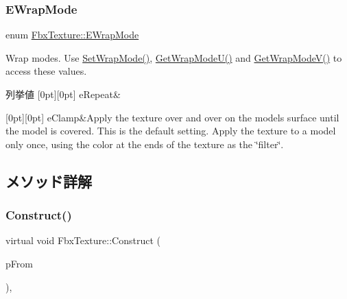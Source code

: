 \subsubsection{\texorpdfstring{E\+Wrap\+Mode}{EWrapMode}}
{\footnotesize\ttfamily enum \hyperlink{class_fbx_texture_ae273dffe3ff532dfd57e7bdb15b121fd}{Fbx\+Texture\+::\+E\+Wrap\+Mode}}

Wrap modes. Use \hyperlink{class_fbx_texture_afb9383ff8cc503b4446247ccdd634ef1}{Set\+Wrap\+Mode()}, \hyperlink{class_fbx_texture_a4df1c01895bf8fb995a5c031de7b77fe}{Get\+Wrap\+Mode\+U()} and \hyperlink{class_fbx_texture_abf31cda728e2ff7f94e10dca19de19d2}{Get\+Wrap\+Mode\+V()} to access these values. \begin{DoxyEnumFields}{列挙値}
[0pt][0pt]{}\mbox{\label{class_fbx_texture_ae273dffe3ff532dfd57e7bdb15b121fda1f253ce288cfae570e2d73d3ee432da8}} 
e\+Repeat&\\
\hline

[0pt][0pt]{}\mbox{\label{class_fbx_texture_ae273dffe3ff532dfd57e7bdb15b121fdac554ea44b46f77162f189cf6d6de7183}} 
e\+Clamp&Apply the texture over and over on the model\textquotesingle{}s surface until the model is covered. This is the default setting. Apply the texture to a model only once, using the color at the ends of the texture as the \char`\"{}filter\char`\"{}. \\
\hline

\end{DoxyEnumFields}


\subsection{メソッド詳解}
\mbox{\label{class_fbx_texture_afc81141345bc807a77dcbd9d6a0d8356}} 
\subsubsection{\texorpdfstring{Construct()}{Construct()}}
{\footnotesize\ttfamily virtual void Fbx\+Texture\+::\+Construct (\begin{DoxyParamCaption}\item[{const \hyperlink{class_fbx_object}{Fbx\+Object} $\ast$}]{p\+From }\end{DoxyParamCaption})\hspace{0.3cm}{\ttfamily [protected]}, {\ttfamily [virtual]}}

